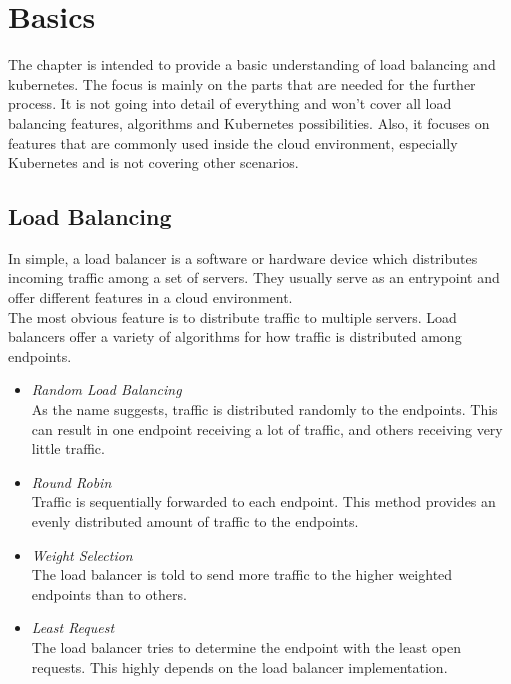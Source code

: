 \chapter{Basics}\label{basics}

The chapter is intended to provide a basic understanding of load balancing and kubernetes.
The focus is mainly on the parts that are needed for the further process.
It is not going into detail of everything and won't cover all load balancing features, algorithms and Kubernetes possibilities.
Also, it focuses on features that are commonly used inside the cloud environment, especially Kubernetes and is not covering other scenarios.

\section{Load Balancing}

In simple, a load balancer is a software or hardware device which distributes incoming traffic among a set of servers.
They usually serve as an entrypoint and offer different features in a cloud environment.
\\
The most obvious feature is to distribute traffic to multiple servers.
Load balancers offer a variety of algorithms for how traffic is distributed among endpoints.~\cite{ALLEN-LOAD-BALANCING}

\begin{itemize}
    \item \textit{Random Load Balancing} \\
    As the name suggests, traffic is distributed randomly to the endpoints.
    This can result in one endpoint receiving a lot of traffic, and others receiving very little traffic.
    \item \textit{Round Robin} \\
    Traffic is sequentially forwarded to each endpoint.
    This method provides an evenly distributed amount of traffic to the endpoints.
    \item \textit{Weight Selection} \\
    The load balancer is told to send more traffic to the higher weighted endpoints than to others.
    \item \textit{Least Request} \\
    The load balancer tries to determine the endpoint with the least open requests.
    This highly depends on the load balancer implementation.
\end{itemize}

